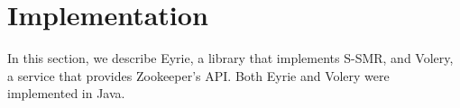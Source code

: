 \documentclass[10pt, conference, compsocconf, letterpaper]{IEEEtranv17}
\begin{document}
%
%
%


\section{Implementation}
\label{sec:implementation}

In this section, we describe Eyrie, a library that implements S-SMR, and Volery, a service that provides Zookeeper's API.
Both Eyrie and Volery were implemented in Java.

\end{document}
